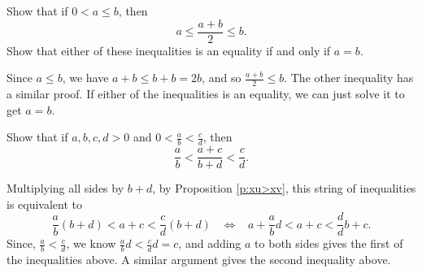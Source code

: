 \documentclass[11pt,dvipsnames]{book}
\numberwithin{figure}{section} %
\numberwithin{table}{section} %
\begin{document}
\begin{exercise} Show that if $0<a\leq b$, then
\[
a\leq \frac{a+b}{2}\leq b.
\]
Show that either of these inequalities is an equality if and only if $a=b$.

\begin{solution}
Since $a\leq b$, we have $a+b\leq b+b=2b$, and so $\frac{a+b}{2} \leq b$. The other inequality has a similar proof. If either of the inequalities is an equality, we can just solve it to get $a=b$.
\end{solution}
\end{exercise}

\begin{exercise} Show that if $a,b,c,d>0$ and $0<\frac{a}{b}<\frac{c}{d}$, then
\[
\frac{a}{b} < \frac{a+c}{b+d}<\frac{c}{d}.
\]
\begin{solution}
Multiplying all sides by $b+d$, by Proposition \ref{p:xu>xv}, this string of inequalities is equivalent to
\[
\frac{a}{b}(b+d) < a+c <\frac{c}{d}(b+d)
\;\; \; \Longleftrightarrow \;\;\;
a+\frac{a}{b}d< a+c <\frac{d}{d}b+c.
\]
Since, $\frac{a}{b}<\frac{c}{d}$, we know $\frac{a}{b}d <\frac{c}{d}d=c$, and adding $a$ to both sides gives the first of the inequalities above. A similar argument gives the second inequality above.
\end{solution}

\end{exercise}
\end{document}
